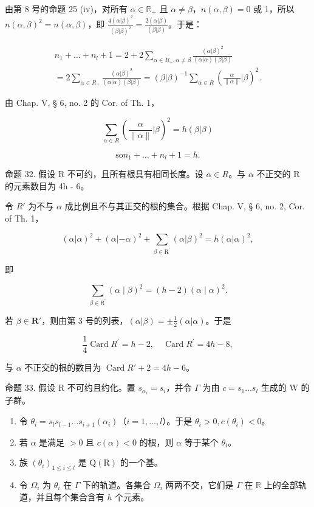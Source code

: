 由第 8 号的命题 25 (iv)，对所有 \(\alpha \in \mathbb{R}_+\) 且 \(\alpha \neq \beta\)，\(n(\alpha, \beta) = 0\) 或 1，所以 \(n(\alpha, \beta)^2 = n(\alpha, \beta)\)，即 \(\frac{4(\alpha | \beta)^2}{(\beta | \beta)^2} = \frac{2(\alpha | \beta)}{(\beta | \beta)}\)。于是：

\[
\begin{array}{l} n _ {1} + \dots + n _ {l} + 1 = 2 + 2 \sum_ {\alpha \in R _ {+}, \alpha \neq \beta} \frac {(\alpha | \beta) ^ {2}}{(\alpha | \alpha) (\beta | \beta)} \\ = 2 \sum_ {\alpha \in R _ {+}} \frac {(\alpha | \beta) ^ {2}}{(\alpha | \alpha) (\beta | \beta)} = (\beta | \beta) ^ {- 1} \sum_ {\alpha \in R} (\frac {\alpha}{\| \alpha \|} | \beta) ^ {2}. \end{array}
\]

由 Chap. V, § 6, no. 2 的 Cor. of Th. 1，

\[
\sum_ {\alpha \in R} \left(\frac {\alpha}{\| \alpha \|} | \beta\right) ^ {2} = h (\beta | \beta)
\]

\[
\mathrm{so} n _ {1} + \dots + n _ {l} + 1 = h.
\]

命题 32. 假设 R 不可约，且所有根具有相同长度。设 \(\alpha \in R\)。与 \(\alpha\) 不正交的 R 的元素数目为 4h - 6。

令 \(R'\) 为不与 \(\alpha\) 成比例且不与其正交的根的集合。根据 Chap. V, § 6, no. 2, Cor. of Th. 1，

\[
(\alpha | \alpha) ^ {2} + (\alpha | - \alpha) ^ {2} + \sum_ {\beta \in \mathrm{R} ^ {\prime}} (\alpha | \beta) ^ {2} = h (\alpha | \alpha) ^ {2},
\]

即

\[
\sum_ {\beta \in \mathsf {R} ^ {\prime}} (\alpha \mid \beta) ^ {2} = (h - 2) (\alpha \mid \alpha) ^ {2}.
\]

若 \(\beta \in \mathbf{R}'\)，则由第 3 号的列表，\((\alpha | \beta) = \pm \frac{1}{2} (\alpha | \alpha)\)。于是

\[
\frac {1}{4} \operatorname{Card} R ^ {\prime} = h - 2, \quad \operatorname{Card} R ^ {\prime} = 4 h - 8,
\]

与 \(\alpha\) 不正交的根的数目为 \(\operatorname{Card} R' + 2 = 4h - 6\)。

命题 33. 假设 R 不可约且约化。置 \(s_{\alpha_i} = s_i\)，并令 \(\Gamma\) 为由 \(c = s_1 \ldots s_l\) 生成的 W 的子群。

\begin{enumerate}
\def\labelenumi{(\roman{enumi})}
\item
  令 \(\theta_{i} = s_{l}s_{l - 1}\dots s_{i + 1}(\alpha_{i})\)（\(i = 1,\dots ,l\)）。于是 \(\theta_{i} > 0,c(\theta_{i}) < 0\)。
\item
  若 \(\alpha\) 是满足 \(>0\) 且 \(c(\alpha) < 0\) 的根，则 \(\alpha\) 等于某个 \(\theta_{i}\)。
\item
  族 \((\theta_{i})_{1\leqslant i\leqslant l}\) 是 \(\mathrm{Q}(\mathrm{R})\) 的一个基。
\item
  令 \(\Omega_{i}\) 为 \(\theta_{i}\) 在 \(\Gamma\) 下的轨道。各集合 \(\Omega_{i}\) 两两不交，它们是 \(\Gamma\) 在 \(\mathbb{R}\) 上的全部轨道，并且每个集合含有 \(h\) 个元素。
\end{enumerate}


